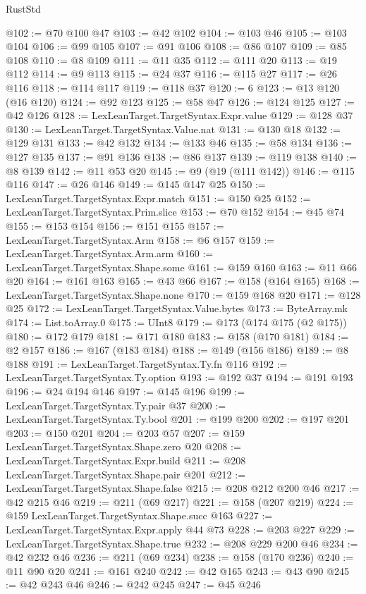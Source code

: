 \begin{lexlean}{RustStd}
\begin{coremodule}
@102 := @70 @100 @47
@103 := @42 @102
@104 := @103 @46
@105 := @103 @104
@106 := @99 @105
@107 := @91 @106
@108 := @86 @107
@109 := @85 @108
@110 := @8 @109
@111 := @11 @35
@112 := @111 @20
@113 := @19 @112
@114 := @9 @113
@115 := @24 @37
@116 := @115 @27
@117 := @26 @116
@118 := @114 @117
@119 := @118 @37
@120 := 6
@123 := @13 @120 (@16 @120)
@124 := @92 @123
@125 := @58 @47
@126 := @124 @125
@127 := @42 @126
@128 := LexLeanTarget.TargetSyntax.Expr.value
@129 := @128 @37
@130 := LexLeanTarget.TargetSyntax.Value.nat
@131 := @130 @18
@132 := @129 @131
@133 := @42 @132
@134 := @133 @46
@135 := @58 @134
@136 := @127 @135
@137 := @91 @136
@138 := @86 @137
@139 := @119 @138
@140 := @8 @139
@142 := @11 @53 @20
@145 := @9 (@19 (@111 @142))
@146 := @115 @116
@147 := @26 @146
@149 := @145 @147 @25
@150 := LexLeanTarget.TargetSyntax.Expr.match
@151 := @150 @25
@152 := LexLeanTarget.TargetSyntax.Prim.slice
@153 := @70 @152
@154 := @45 @74
@155 := @153 @154
@156 := @151 @155
@157 := LexLeanTarget.TargetSyntax.Arm
@158 := @6 @157
@159 := LexLeanTarget.TargetSyntax.Arm.arm
@160 := LexLeanTarget.TargetSyntax.Shape.some
@161 := @159 @160
@163 := @11 @66 @20
@164 := @161 @163
@165 := @43 @66
@167 := @158 (@164 @165)
@168 := LexLeanTarget.TargetSyntax.Shape.none
@170 := @159 @168 @20
@171 := @128 @25
@172 := LexLeanTarget.TargetSyntax.Value.bytes
@173 := ByteArray.mk
@174 := List.toArray.{0}
@175 := UInt8
@179 := @173 (@174 @175 (@2 @175))
@180 := @172 @179
@181 := @171 @180
@183 := @158 (@170 @181)
@184 := @2 @157
@186 := @167 (@183 @184)
@188 := @149 (@156 @186)
@189 := @8 @188
@191 := LexLeanTarget.TargetSyntax.Ty.fn @116
@192 := LexLeanTarget.TargetSyntax.Ty.option
@193 := @192 @37
@194 := @191 @193
@196 := @24 @194 @146
@197 := @145 @196
@199 := LexLeanTarget.TargetSyntax.Ty.pair @37
@200 := LexLeanTarget.TargetSyntax.Ty.bool
@201 := @199 @200
@202 := @197 @201
@203 := @150 @201
@204 := @203 @57
@207 := @159 LexLeanTarget.TargetSyntax.Shape.zero @20
@208 := LexLeanTarget.TargetSyntax.Expr.build
@211 := @208 LexLeanTarget.TargetSyntax.Shape.pair @201
@212 := LexLeanTarget.TargetSyntax.Shape.false
@215 := @208 @212 @200 @46
@217 := @42 @215 @46
@219 := @211 (@69 @217)
@221 := @158 (@207 @219)
@224 := @159 LexLeanTarget.TargetSyntax.Shape.succ @163
@227 := LexLeanTarget.TargetSyntax.Expr.apply @44 @73
@228 := @203 @227
@229 := LexLeanTarget.TargetSyntax.Shape.true
@232 := @208 @229 @200 @46
@234 := @42 @232 @46
@236 := @211 (@69 @234)
@238 := @158 (@170 @236)
@240 := @11 @90 @20
@241 := @161 @240
@242 := @42 @165
@243 := @43 @90
@245 := @42 @243 @46
@246 := @242 @245
@247 := @45 @246

\end{coremodule}
\end{lexlean}

